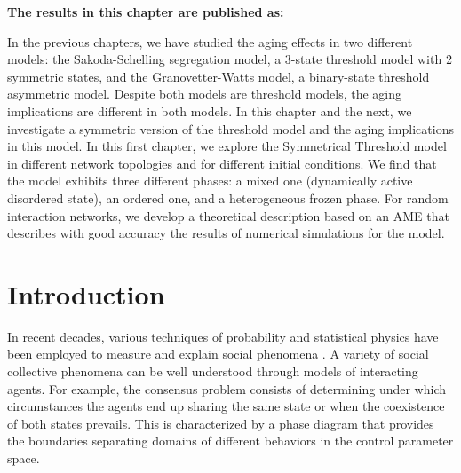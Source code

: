 \vspace{-1.5cm}
\small
\textbf{The results in this chapter are published as:}
\vspace{0.05 cm}

\normalsize
\vspace{0.5 cm}

In the previous chapters, we have studied the aging effects in two different models: the Sakoda-Schelling segregation model, a 3-state threshold model with 2 symmetric states, and the Granovetter-Watts model, a binary-state threshold asymmetric model. Despite both models are threshold models, the aging implications are different in both models. In this chapter and the next, we investigate a symmetric version of the threshold model and the aging implications in this model. In this first chapter, we explore the Symmetrical Threshold model in different network topologies and for different initial conditions. We find that the model exhibits three different phases: a mixed one (dynamically active disordered state), an ordered one, and a heterogeneous frozen phase. For random interaction networks, we develop a theoretical description based on an AME that describes with good accuracy the results of numerical simulations for the model.

\section{\label{sec:Introduction} Introduction}

In recent decades, various techniques of probability and statistical physics have been employed to measure and explain social phenomena \cite{castellano2009statistical,jusup2022social,bianconi2023complex}. A variety of social collective phenomena can be well understood through models of interacting agents. For example, the consensus problem consists of determining under which circumstances the agents end up sharing the same state or when the coexistence of both states prevails. This is characterized by a phase diagram that provides the boundaries separating domains of different behaviors in the control parameter space.

